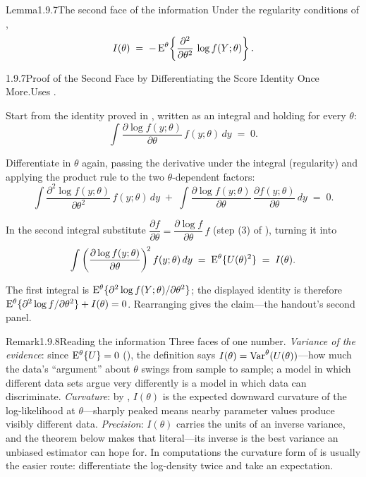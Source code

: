 \documentclass[main.tex]{subfiles}
\begin{document}
\begin{Obj}{Lemma}{1.9.7}{The second face of the information}
Under the regularity conditions of ,
\[ I(\theta) \;=\; -\,\mathrm{E}^{\theta}\!\left\{\frac{\partial^2}{\partial\theta^2}\,
   \log f(Y;\theta)\right\} . \]
\end{Obj}
\begin{Prf}{1.9.7}{Proof of the Second Face by Differentiating the Score Identity Once More.}{Uses .}
\item Start from the identity proved in , written as an integral and holding for
      every $\theta$:
      \[ \int \frac{\partial \log f(y;\theta)}{\partial\theta}\,f(y;\theta)\,dy \;=\; 0 . \]
\item Differentiate in $\theta$ again, passing the derivative under the integral
      (regularity) and applying the product rule to the two $\theta$-dependent factors:
      \[ \int \frac{\partial^2 \log f(y;\theta)}{\partial\theta^2}\,f(y;\theta)\,dy
         \;+\; \int \frac{\partial \log f(y;\theta)}{\partial\theta}\,
         \frac{\partial f(y;\theta)}{\partial\theta}\,dy \;=\; 0 . \]
\item In the second integral substitute
      $\dfrac{\partial f}{\partial\theta}=\dfrac{\partial \log f}{\partial\theta}\,f$ (step
      (3) of ), turning it into
      \[ \int \left(\frac{\partial \log f(y;\theta)}{\partial\theta}\right)^{\!2}
         f(y;\theta)\,dy \;=\; \mathrm{E}^{\theta}\{U(\theta)^2\} \;=\; I(\theta) . \]
\item The first integral is $\mathrm{E}^{\theta}\{\partial^2 \log f(Y;\theta)/\partial\theta^2\}$;
      the displayed identity is therefore
      $\mathrm{E}^{\theta}\{\partial^2\log f/\partial\theta^2\} + I(\theta)=0$. Rearranging gives the
      claim---the handout's second panel.
\end{Prf}

\begin{ObjL}{Remark}{1.9.8}{Reading the information}
Three faces of one number. \emph{Variance of the evidence}: since $\mathrm{E}^{\theta}\{U\}=0$
(), the definition says $I(\theta)=\operatorname{Var}^{\theta}(U(\theta))$---how much the
data's ``argument'' about $\theta$ swings from sample to sample; a model in which different
data sets argue very differently is a model in which data can discriminate. \emph{Curvature}:
by , $I(\theta)$ is the expected downward curvature of the log-likelihood at
$\theta$---sharply peaked means nearby parameter values produce visibly different data.
\emph{Precision}: $I(\theta)$ carries the units of an inverse variance, and the theorem below
makes that literal---its inverse is the best variance an unbiased estimator can hope for. In
computations the curvature form of  is usually the easier route: differentiate
the log-density twice and take an expectation.
\end{ObjL}
\end{document}
